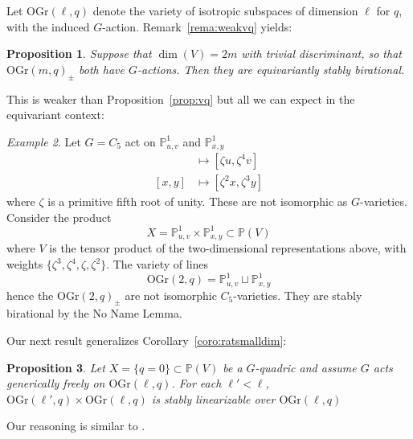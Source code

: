 \documentclass[12pt]{amsart}
\numberwithin{equation}{section}
\newcommand{\bP}{\mathbb{P}}
\newcommand{\OGr}{\mathrm{OGr}}
\theoremstyle{plain}
\newtheorem{prop}{Proposition}[section]
\theoremstyle{definition}
\theoremstyle{remark}
\newtheorem{exam}[prop]{Example}
\begin{document}
Let $\OGr(\ell, q)$ denote the 
variety of isotropic subspaces 
of dimension $\ell$ for $q$, 
with the induced $G$-action.
Remark~\ref{rema:weakvq} yields:
\begin{prop} \label{prop:maxstabrat}
Suppose that $\dim(V)=2m$ with trivial discriminant, so
that $\OGr(m,q)_{\pm}$ both have $G$-actions. Then they
are equivariantly stably birational.
\end{prop}
This is weaker than Proposition~\ref{prop:vq} but
all we can expect in the equivariant context:
\begin{exam}
Let $G=C_5$ act on $\bP^1_{u,v}$ and $\bP^1_{x,y}$
\begin{align*}
[u,v] &\mapsto [\zeta u, \zeta^4 v] \\
[x,y] &\mapsto [\zeta^2 x, \zeta^3 y]
\end{align*}
where $\zeta$ is a primitive fifth root of unity.
These are not isomorphic as $G$-varieties.
Consider the product
$$X = \bP^1_{u,v} \times \bP^1_{x,y} \subset \bP(V)$$
where $V$ is the tensor product of the two-dimensional representations
above, with weights $\{\zeta^3,\zeta^4,\zeta,\zeta^2\}$.
The variety of lines
$$\OGr(2,q) = \bP^1_{u,v}\sqcup \bP^1_{x,y}$$
hence the $\OGr(2,q)_{\pm}$ are not isomorphic $C_5$-varieties. They are stably birational by the No Name Lemma.
\end{exam}


Our next result generalizes Corollary~\ref{coro:ratsmalldim}:
\begin{prop} \label{prop:Wittdimred}
Let $X=\{q=0\}\subset \bP(V)$ be a $G$-quadric and assume $G$
acts generically freely on $\OGr(\ell,q)$. For each $\ell'<\ell$, 
$\OGr(\ell',q) \times \OGr(\ell,q)$
is stably linearizable over $\OGr(\ell,q)$
\end{prop}


Our reasoning is similar to \cite[Sec.~2.2]{lena}. 
\end{document}
